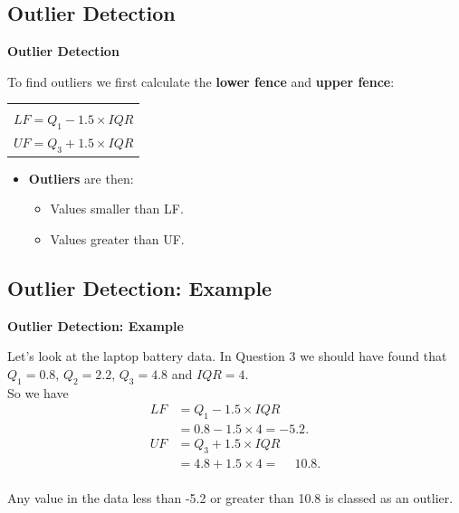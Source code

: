 \documentclass[compress]{beamer}        %
\makeatletter
\newcommand{\tcb}{\textcolor{beamer@blendedblue}}
\newcommand{\m}{\phantom{-}}
\makeatother
\begin{document}
\subsection{Outlier Detection}
\begin{frame}{\bf \tcb{Outlier Detection}}

To find outliers we first calculate the {\bf lower fence} and {\bf upper fence}:
\begin{center}
\begin{tabular}{|c|}
\hline
\\[-0.4cm]
$LF = Q_1 - 1.5 \times IQR$ \\[0.2cm]
$UF = Q_3 + 1.5 \times IQR$ \\
\hline
\end{tabular}
\end{center}

\begin{itemize}
\item {\bf Outliers} are then:\\[0.2cm]
\begin{itemize}\itemsep0.4cm
\item Values smaller than LF.
\item Values greater than UF.
\end{itemize}
\end{itemize}


\end{frame}


\subsection{Outlier Detection: Example}
\begin{frame}{\bf \tcb{Outlier Detection: Example}}

Let's look at the laptop battery data. In Question 3 we should have found that $Q_1 = 0.8$, $Q_2 = 2.2$, $Q_3 = 4.8$ and $IQR = 4$.\\[0.3cm]

So we have
\begin{align*}
LF &= Q_1 - 1.5 \times IQR\\
   &= 0.8 - 1.5 \times 4 = -5.2. \\[0.3cm]
UF &= Q_3 + 1.5 \times IQR\\
   &= 4.8 + 1.5 \times 4 = \m10.8. \\
\end{align*}

Any value in the data less than -5.2 or greater than 10.8 is classed as an outlier.

\end{frame}
\end{document}
